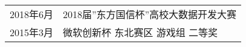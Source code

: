 %
%



\begin{tabular}{rl}	
	2018年6月 & 2018届”东方国信杯”高校大数据开发大赛 \\
	2015年3月 &  微软创新杯 东北赛区 游戏组 二等奖 \\
\end{tabular}

